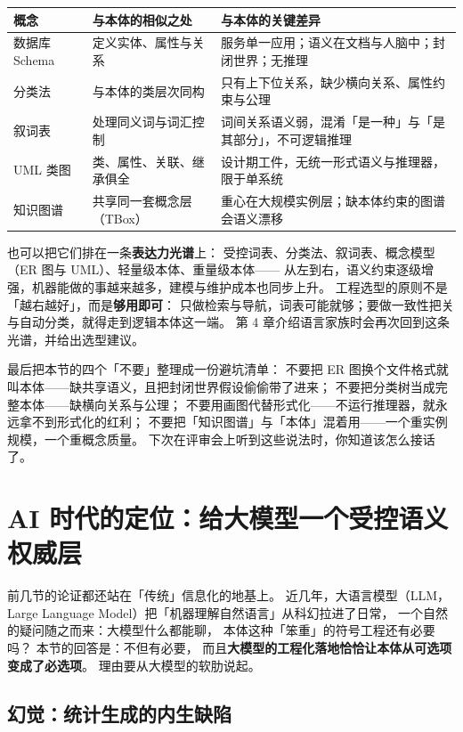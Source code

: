 \begin{center}
\begin{tabularx}{\linewidth}{@{}lXX@{}}
\toprule
\textbf{概念} & \textbf{与本体的相似之处} & \textbf{与本体的关键差异} \\
\midrule
数据库 Schema & 定义实体、属性与关系 & 服务单一应用；语义在文档与人脑中；封闭世界；无推理 \\
分类法 & 与本体的类层次同构 & 只有上下位关系，缺少横向关系、属性约束与公理 \\
叙词表 & 处理同义词与词汇控制 & 词间关系语义弱，混淆「是一种」与「是其部分」，不可逻辑推理 \\
UML 类图 & 类、属性、关联、继承俱全 & 设计期工件，无统一形式语义与推理器，限于单系统 \\
知识图谱 & 共享同一套概念层（TBox） & 重心在大规模实例层；缺本体约束的图谱会语义漂移 \\
\bottomrule
\end{tabularx}
\end{center}

也可以把它们排在一条\textbf{表达力光谱}上：
受控词表、分类法、叙词表、概念模型（ER 图与 UML）、轻量级本体、重量级本体——
从左到右，语义约束逐级增强，机器能做的事越来越多，建模与维护成本也同步上升。
工程选型的原则不是「越右越好」，而是\textbf{够用即可}：
只做检索与导航，词表可能就够；要做一致性把关与自动分类，就得走到逻辑本体这一端。
第 4 章介绍语言家族时会再次回到这条光谱，并给出选型建议。

最后把本节的四个「不要」整理成一份避坑清单：
不要把 ER 图换个文件格式就叫本体——缺共享语义，且把封闭世界假设偷偷带了进来；
不要把分类树当成完整本体——缺横向关系与公理；
不要用画图代替形式化——不运行推理器，就永远拿不到形式化的红利；
不要把「知识图谱」与「本体」混着用——一个重实例规模，一个重概念质量。
下次在评审会上听到这些说法时，你知道该怎么接话了。

\section{AI 时代的定位：给大模型一个受控语义权威层}

前几节的论证都还站在「传统」信息化的地基上。
近几年，大语言模型（LLM，Large Language Model）把「机器理解自然语言」从科幻拉进了日常，
一个自然的疑问随之而来：大模型什么都能聊，
本体这种「笨重」的符号工程还有必要吗？
本节的回答是：不但有必要，
而且\textbf{大模型的工程化落地恰恰让本体从可选项变成了必选项}。
理由要从大模型的软肋说起。

\subsection{幻觉：统计生成的内生缺陷}

